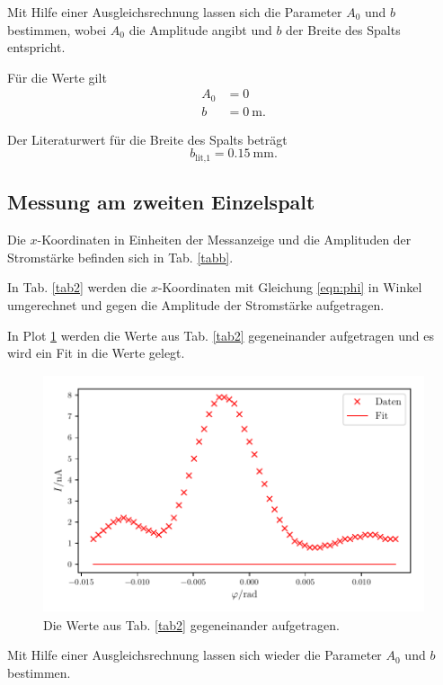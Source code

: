 \noindent Mit Hilfe einer Ausgleichsrechnung lassen sich die Parameter $A_0$ und $b$ bestimmen, wobei $A_0$ die Amplitude angibt und $b$ der Breite des Spalts entspricht. 

\noindent Für die Werte gilt
\begin{align*}
    A_0 &= \num{0} \\
    b &= \SI{0}{\meter}.
\end{align*}

\noindent Der Literaturwert für die Breite des Spalts beträgt
\begin{equation*}
    b_{\text{lit,1}} = \SI{0.15}{\milli\meter}.
\end{equation*}


\subsection{Messung am zweiten Einzelspalt}
Die $x$-Koordinaten in Einheiten der Messanzeige und die Amplituden der Stromstärke befinden sich in Tab. \ref{tabb}. 



\noindent In Tab. \ref{tab2} werden die $x$-Koordinaten mit Gleichung \eqref{eqn:phi} in Winkel umgerechnet und gegen die Amplitude der Stromstärke aufgetragen. 



\noindent In Plot \ref{fig:plot2} werden die Werte aus Tab. \ref{tab2} gegeneinander aufgetragen und es wird ein Fit in die Werte gelegt. 
\begin{figure}
    \centering
    \includegraphics[width=12cm, height=7cm]{build/plot2.pdf}
    \caption{Die Werte aus Tab. \ref{tab2} gegeneinander aufgetragen.}
    \label{fig:plot2}
\end{figure}

\noindent Mit Hilfe einer Ausgleichsrechnung lassen sich wieder die Parameter $A_0$ und $b$ bestimmen. 


